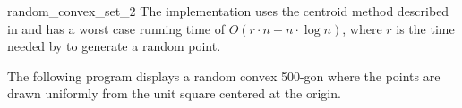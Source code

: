 \begin{ccRefFunction}{random_convex_set_2}
\ccImplementation 
The implementation uses the centroid method
described in \cite{s-zkm-96} and has a worst case running time of $O(r
\cdot n + n \cdot \log n)$, where $r$ is the time needed by 
to generate a random point.

\ccExample

The following program displays a random convex 500-gon where the
points are drawn uniformly from the unit square centered at the
origin.



\end{ccRefFunction}

